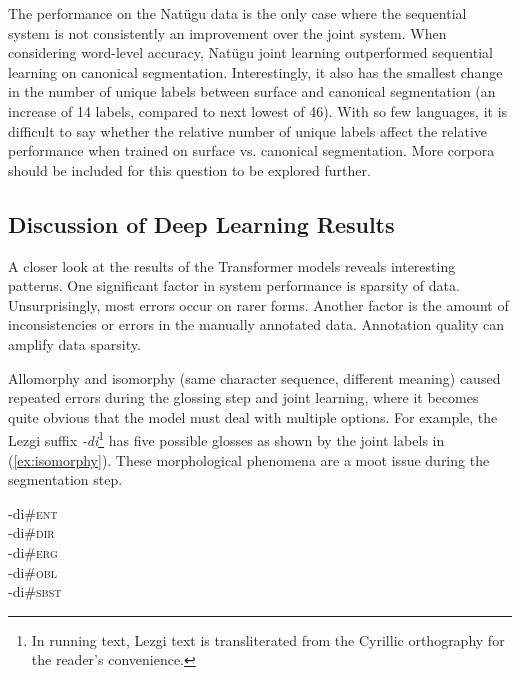 The performance on the Nat\"ugu data is the only case where the sequential system is not consistently an improvement over the joint system. 
When considering word-level accuracy, Nat\"ugu joint learning outperformed sequential learning on canonical segmentation. Interestingly, it also has the smallest change in the number of unique labels between surface and canonical segmentation (an increase of 14 labels, compared to next lowest of 46). With so few languages, it is difficult to say whether the relative number of unique labels affect the relative performance when trained on surface vs. canonical segmentation. More corpora should be included for this question to be explored further. %
 

\subsection{Discussion of Deep Learning Results}
\label{sec:sgDLanalysis}

A closer look at the results of the Transformer models reveals interesting patterns. One significant factor in system performance is sparsity of data. Unsurprisingly, most errors occur on rarer forms. 
Another factor is the amount of inconsistencies or errors in the manually annotated data. Annotation quality can amplify data sparsity. 

Allomorphy and isomorphy (same character sequence, different meaning) caused repeated errors during the glossing step and joint learning, where it becomes quite obvious that the model must deal with multiple options. For example, the Lezgi suffix \textit{-di}\footnote{In running text, Lezgi text is transliterated from the Cyrillic orthography for the reader's convenience.} has five possible glosses as shown by the joint labels in (\ref{ex:isomorphy}). These morphological phenomena are a moot issue during the segmentation step. 

\pex   
\label{ex:isomorphy}
-di\#\textsc{ent} \\
-di\#\textsc{dir} \\
-di\#\textsc{erg} \\
-di\#\textsc{obl} \\
-di\#\textsc{sbst} 
\xe

